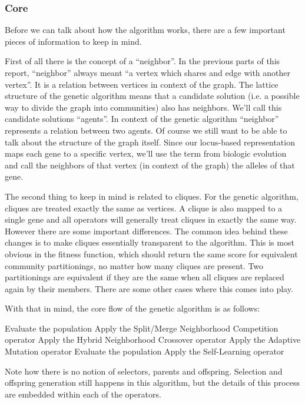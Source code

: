 \subsubsection{Core}
Before we can talk about how the algorithm works, there are a few important pieces of information to keep in mind. 
\par
First of all there is the concept of a ``neighbor''. In the previous parts of this report, ``neighbor'' always meant ``a vertex which shares and edge with another vertex''. It is a relation between vertices in context of the graph. The lattice structure of the genetic algorithm means that a candidate solution (i.e. a possible way to divide the graph into communities) also has neighbors. We'll call this candidate solutions ``agents''. In context of the genetic algorithm ``neighbor'' represents a relation between two agents. Of course we still want to be able to talk about the structure of the graph itself. Since our locus-based representation maps each gene to a specific vertex, we'll use the term from biologic evolution and call the neighbors of that vertex (in context of the graph) the alleles of that gene.
\par
The second thing to keep in mind is related to cliques. For the genetic algorithm, cliques are treated exactly the same as vertices. A clique is also mapped to a single gene and all operators will generally treat cliques in exactly the same way. However there are some important differences. The common idea behind these changes is to make cliques essentially transparent to the algorithm. This is most obvious in the fitness function, which should return the same score for equivalent community partitionings, no matter how many cliques are present. Two partitionings are equivalent if they are the same when all cliques are replaced again by their members. There are some other cases where this comes into play.
\par
With that in mind, the core flow of the genetic algorithm is as follows:
\begin{algorithmic}[1]
\STATE Evaluate the population
\STATE Apply the Split/Merge Neighborhood Competition operator
\STATE Apply the Hybrid Neighborhood Crossover operator
\STATE Apply the Adaptive Mutation operator
\STATE Evaluate the population
\STATE Apply the Self-Learning operator
\end{algorithmic}
Note how there is no notion of selectors, parents and offspring. Selection and offspring generation still happens in this algorithm, but the details of this process are embedded within each of the operators.
